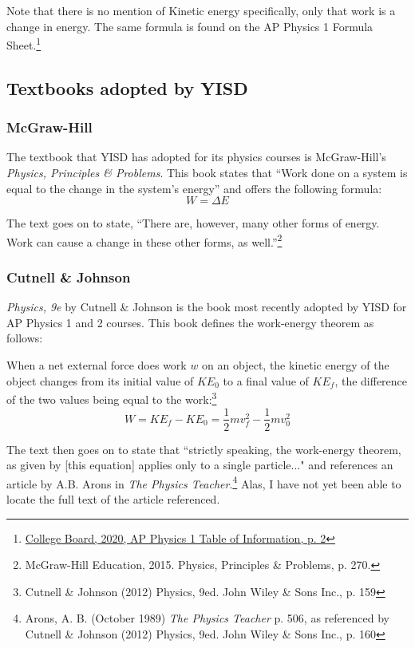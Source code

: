 \documentclass[letterpaper, 12pt]{article}
\begin{document}
Note that there is no mention of Kinetic energy specifically, only that work is a change in energy.  The same formula is found on the AP Physics 1 Formula Sheet.\footnote{\color{blue}\href{https://apcentral.collegeboard.org/pdf/physics-1-equations-sheet-2020.pdf}{College Board, 2020,  AP Physics 1 Table of Information, p. 2}\color{black}}


\subsection{Textbooks adopted by YISD}
\subsubsection{McGraw-Hill}
The textbook that YISD has adopted for its physics courses is McGraw-Hill's \textit{Physics, Principles \& Problems}.  This book states that ``Work done on a system is equal to the change in the system's energy''  and offers the following formula: 
\begin{equation}
	W = \Delta E
\end{equation}

The text goes on to state, ``There are, however, many other forms of energy.  Work can cause a change in these other forms, as well.''\footnote{McGraw-Hill Education, 2015.  Physics, Principles \& Problems, p. 270.}
\subsubsection{Cutnell \& Johnson}
\textit{Physics, 9e} by Cutnell \& Johnson is the book most recently adopted by YISD for AP Physics 1 and 2 courses.  This book defines the work-energy theorem as follows: 

\begin{displayquote}
	When a net external force does work $w$ on an object, the kinetic energy of the object changes from its initial value of $KE_0$ to a final value of $KE_f$, the difference of the two values being equal to the work:\footnote{Cutnell \& Johnson (2012) Physics, 9ed. John Wiley \& Sons Inc., p. 159}
	\begin{equation}
		W = KE_f - KE_0 = \frac{1}{2}mv_f^2 - \frac{1}{2}mv_0^2
	\end{equation}
\end{displayquote}

The text then goes on to state that ``strictly speaking, the work-energy theorem, as given by [this equation] applies only to a single particle..." and references an article by A.B. Arons in \textit{The Physics Teacher}.\footnote{Arons, A. B. (October 1989) \textit{The Physics Teacher} p. 506, as referenced by Cutnell \& Johnson (2012) Physics, 9ed. John Wiley \& Sons Inc., p. 160}  Alas, I have not yet been able to locate the full text of the article referenced.  
\end{document}
